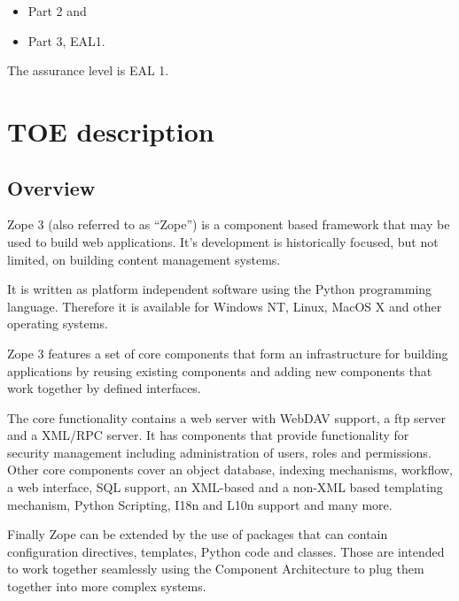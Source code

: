 \documentclass[12pt,english]{scrbook}
\begin{document}
\begin{itemize}
  
  \item Part 2 and
  
  \item Part 3, EAL1.

\end{itemize}

The assurance level is EAL 1.





\chapter{TOE description}





\section{Overview}

Zope 3 (also referred to as ``Zope'') is a component based framework that may
be used to build web applications. It's development is historically focused,
but not limited, on building content management systems.

It is written as platform independent software using the Python programming
language. Therefore it is available for Windows NT, Linux, MacOS X and other
operating systems.

Zope 3 features a set of core components that form an infrastructure for 
building applications by reusing existing components and adding new components
that work together by defined interfaces.

The core functionality contains a web server with WebDAV support, a ftp server
and a XML/RPC server.  It has components that provide functionality for
security management including administration of users, roles and permissions.
Other core components cover an object database, indexing mechanisms,
workflow, a web interface, SQL support, an XML-based and a non-XML based templating
mechanism, Python Scripting, I18n and L10n support and many more.

Finally Zope can be extended by the use of packages that can contain
configuration directives, templates, Python code and classes. Those are
intended to work together seamlessly using the Component Architecture to plug
them together into more complex systems.
\end{document}
